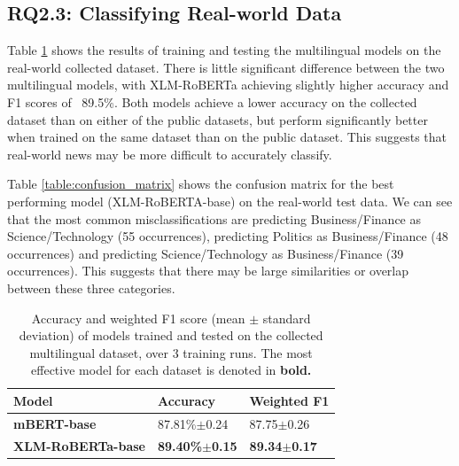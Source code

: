 \documentclass{l4proj}
\begin{document}
\subsection{RQ2.3: Classifying Real-world Data}
\label{section:rq2.3}
Table \ref{table:realworld-effectiveness} shows the results of training and testing the multilingual models on the real-world collected dataset. There is little significant difference between the two multilingual models, with XLM-RoBERTa achieving slightly higher accuracy and F1 scores of ~89.5\%. Both models achieve a lower accuracy on the collected dataset than on either of the public datasets, but perform significantly better when trained on the same dataset than on the public dataset. This suggests that real-world news may be more difficult to accurately classify. \par
Table \ref{table:confusion_matrix} shows the confusion matrix for the best performing model (XLM-RoBERTA-base) on the real-world test data. We can see that the most common misclassifications are predicting Business/Finance as Science/Technology (55 occurrences), predicting Politics as Business/Finance (48 occurrences) and predicting Science/Technology as Business/Finance (39 occurrences). This suggests that there may be large similarities or overlap between these three categories.

\begin{table}[h]
\begin{tabular}{lll}
\hline
\textbf{Model}   & \textbf{Accuracy} & \textbf{Weighted F1} \\ \hline
\textbf{mBERT-base}       & 87.81\%$\pm$0.24     & 87.75$\pm$0.26        \\
\textbf{XLM-RoBERTa-base} & \textbf{89.40\%$\pm$0.15}     & \textbf{89.34$\pm$0.17}                 \\ \hline
\end{tabular}
\caption{Accuracy and weighted F1 score (mean $\pm$ standard deviation) of models trained and tested on the collected multilingual dataset, over 3 training runs. The most effective model for each dataset is denoted in \textbf{bold.}}
\label{table:realworld-effectiveness}
\end{table}
\end{document}
